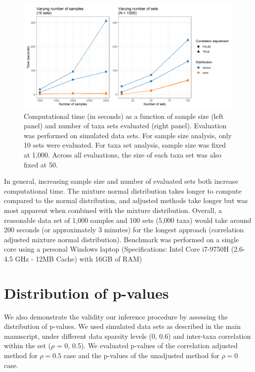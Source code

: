 \documentclass{article}
\begin{document}
\begin{figure}[!ht]
    \centering
    \includegraphics[width=\textwidth]{figures/performance.png}
    \caption{Computational time (in seconds) as a function of sample size (left panel) and number of taxa sets evaluated (right panel). Evaluation was performed on simulated data sets. For sample size analysis, only 10 sets were evaluated. For taxa set analysis, sample size was fixed at 1,000. Across all evaluations, the size of each taxa set was also fixed at 50.}
    \label{fig:s1}
\end{figure}

In general, increasing sample size and number of evaluated sets both increase computational time. The mixture normal distribution takes longer to compute compared to the normal distribution, and adjusted methods take longer but was most apparent when combined with the mixture distribution. Overall, a reasonable data set of 1,000 samples and 100 sets (5,000 taxa) would take around 200 seconds (or approximately 3 minutes) for the longest approach (correlation adjusted mixture normal distribution). Benchmark was performed on a single core using a personal Windows laptop (Specifications: Intel Core i7-9750H (2.6-4.5 GHz - 12MB Cache) with 16GB of RAM)

\section{Distribution of p-values}
We also demonstrate the validity our inference procedure by assessing the distribution of p-values. We used simulated data sets as described in the main manuscript, under different data sparsity levels (0, 0.6) and inter-taxa correlation within the set ($\rho$ = 0, 0.5). We evaluated p-values of the correlation adjusted method for $\rho = 0.5$ case and the p-values of the unadjusted method for $\rho = 0$ case.  
\end{document}
